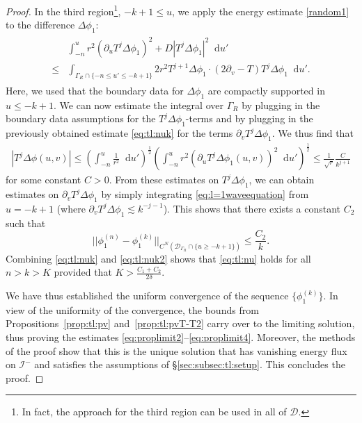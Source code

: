 \documentclass[11pt,english]{article}
\numberwithin{equation}{section}
\theoremstyle{remark}
\theoremstyle{plain}
\theoremstyle{remark}
\newcommand{\dd}{\mathop{}\!\mathrm{d}}
\newcommand{\pu}{\partial_u}
\newcommand{\pv}{\partial_v}
\renewcommand{\(}{\left(}
\renewcommand{\)}{\right)}
\begin{document}
\begin{proof}
In the third region\footnote{In fact, the approach for the third region can be used in all of $\mathcal D$.}, $-k+1\leq u$, we  apply the energy estimate \eqref{random1} to the difference $\Delta\phi_1$:
\begin{align*}
\begin{split}
&\int_{-n}^u r^2(\pu T^j\Delta\phi_{1})^2+D|T^j\Delta \phi_{1}|^2\dd u'	 \\
\leq&\int_{\Gamma_R\cap\{-n\leq u'\leq -k+1 \}}  2r^2 T^{j+1}\Delta\phi_{1}\cdot (2\pv-T)T^j \Delta\phi_{1}	 \dd u'.
\end{split}
\end{align*}
Here, we used that the boundary data for $\Delta\phi_1$ are compactly supported in $u\leq -k+1$.
We can now estimate the integral over $\Gamma_R$ by plugging in the boundary data assumptions for the $T^j\Delta\phi_1$-terms and by plugging in the previously obtained estimate \eqref{eq:tl:nuk} for the terms $\pv T^j \Delta\phi_1$. We thus find that
\begin{align*}
|T^j\Delta\phi(u,v)|\leq \left(\int_{-n}^u \frac{1}{r^2}\dd u'\right)^{\frac12}\left(\int_{-n}^u	r^2(\pu T^j\Delta\phi_1(u,v))^2\dd u'	\right)^{\frac12}\leq\frac{1}{\sqrt{r}} \frac{C}{k^{j+1}}
\end{align*}
for some constant $C>0$. From these estimates on $T^j\Delta\phi_1$, we can obtain estimates on $\pv T^j\Delta\phi_1$ by simply integrating \eqref{eq:l=1waveequation} from $u=-k+1$ (where $\pv T^j \Delta\phi_1\lesssim k^{-j-1}$). This shows that there exists a constant $C_2$ such that
 \begin{equation}\label{eq:tl:nuk2}
||\phi_1^{(n)}-\phi_1^{(k)}||_{C^N(\mathcal{D}_{\Gamma_R}\cap\{u\geq -k+1\})}\leq \frac{C_2}{k}.
\end{equation}
Combining \eqref{eq:tl:nuk} and \eqref{eq:tl:nuk2} shows that \eqref{eq:tl:nu} holds for all $n>k>K$ provided that $K>\frac{C_1+C_2}{2\delta}$.

We have thus established the uniform convergence of the sequence $\{\phi_1^{(k)}\}$. In view of the uniformity of the convergence, the bounds from Propositions~\ref{prop:tl:pv} and~\ref{prop:tl:pvT-T2}  carry over to the limiting solution, thus proving the estimates  \eqref{eq:proplimit2}--\eqref{eq:proplimit4}. Moreover, the methods of the proof show that this is the unique solution that has vanishing energy flux on $\mathcal I^-$ and satisfies the assumptions of \S \ref{sec:subsec:tl:setup}. This concludes the proof.
\end{proof}
\end{document}
